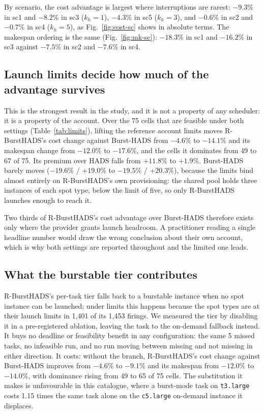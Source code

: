 \documentclass[conference]{IEEEtran}
\begin{document}
By scenario, the cost advantage is largest where interruptions are rarest:
$-9.3$\% in sc1 and $-8.2$\% in sc3 ($k_h = 1$), $-4.3$\% in sc5 ($k_h = 3$),
and $-0.6$\% in sc2 and $-0.7$\% in sc4 ($k_h = 5$), as Fig.~\ref{fig:cost-sc}
shows in absolute terms. The makespan ordering is the same
(Fig.~\ref{fig:mk-sc}): $-18.3$\% in sc1 and $-16.2$\% in sc3 against
$-7.5$\% in sc2 and $-7.6$\% in sc4.

\subsection{Launch limits decide how much of the advantage survives}

This is the strongest result in the study, and it is not a property of any
scheduler: it is a property of the account. Over the 75 cells that are feasible
under both settings (Table~\ref{tab:limits}), lifting the reference account
limits moves R-BurstHADS's cost change against Burst-HADS from $-4.6$\% to
$-14.1$\% and its makespan change from $-12.0$\% to $-17.6$\%, and the cells it
dominates from 49 to 67 of 75. Its premium over HADS falls from $+11.8$\% to
$+1.9$\%. Burst-HADS barely moves ($-19.6$\% / $+19.0$\% to $-19.5$\% /
$+20.3$\%), because the limits bind almost entirely on R-BurstHADS's own
provisioning: the shared pool holds three instances of each spot type, below
the limit of five, so only R-BurstHADS launches enough to reach it.

Two thirds of R-BurstHADS's cost advantage over Burst-HADS therefore exists
only where the provider grants launch headroom. A practitioner reading a single
headline number would draw the wrong conclusion about their own account, which
is why both settings are reported throughout and the limited one leads.

\subsection{What the burstable tier contributes}

R-BurstHADS's per-task tier falls back to a burstable instance when no spot
instance can be launched; under limits this happens because the spot types are
at their launch limits in 1{,}401 of its 1{,}453 firings. We measured the tier
by disabling it in a pre-registered ablation, leaving the task to the on-demand
fallback instead. It buys no deadline or feasibility benefit in any
configuration: the same 5 missed tasks, no infeasible run, and no run moving
between missing and not missing in either direction. It costs: without the
branch, R-BurstHADS's cost change against Burst-HADS improves from $-4.6$\% to
$-9.1$\% and its makespan from $-12.0$\% to $-14.0$\%, with dominance rising
from 49 to 65 of 75 cells. The substitution it makes is unfavourable in this
catalogue, where a burst-mode task on \texttt{t3.large} costs 1.15 times the
same task alone on the \texttt{c5.large} on-demand instance it displaces.
\end{document}
